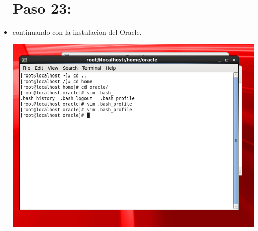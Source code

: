 \documentclass{article}
\begin{document}
\begin{itemize}
	
\newpage
\section{Paso 23:}
	\item continuando con la instalacion del Oracle.
	\begin{center}
	\includegraphics[width=13cm]{./Imagenes/imagen23} 
	\end{center}

\end{itemize} 
\end{document}
